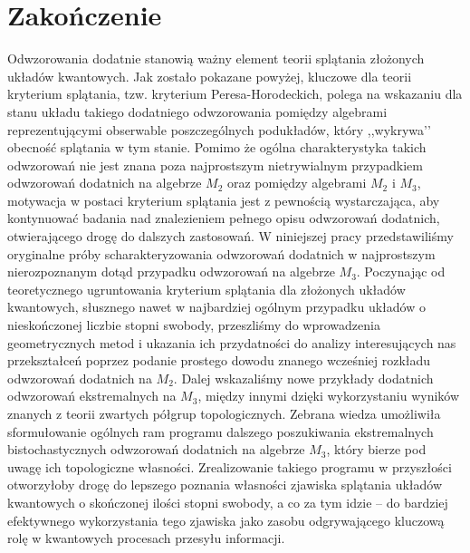 \chapter*{Zakończenie}
    \label{chap:Zakończenie}

Odwzorowania dodatnie stanowią ważny element teorii splątania złożonych
układów kwantowych.
Jak zostało pokazane powyżej,
kluczowe dla teorii kryterium splątania,
tzw. kryterium Peresa-Horodeckich,
polega na wskazaniu dla stanu układu takiego
dodatniego odwzorowania pomiędzy algebrami reprezentującymi obserwable
poszczególnych podukładów, który ,,wykrywa’’ obecność splątania w tym stanie.
Pomimo że ogólna charakterystyka takich odwzorowań nie jest znana poza
najprostszym nietrywialnym przypadkiem odwzorowań dodatnich na algebrze
$M_{2}$ oraz pomiędzy algebrami $M_{2}$ i $M_{3}$, motywacja w postaci kryterium
splątania jest z pewnością wystarczająca,
aby kontynuować badania nad znalezieniem pełnego opisu odwzorowań dodatnich,
otwierającego drogę do dalszych zastosowań.
W niniejszej pracy przedstawiliśmy oryginalne próby scharakteryzowania
odwzorowań dodatnich w najprostszym nierozpoznanym dotąd przypadku odwzorowań
na algebrze $M_{3}$.
Poczynając od teoretycznego ugruntowania kryterium splątania dla złożonych
układów kwantowych,
słusznego nawet w najbardziej ogólnym przypadku układów
o nieskończonej liczbie stopni swobody,
przeszliśmy do wprowadzenia geometrycznych metod i ukazania ich przydatności do
analizy interesujących nas przekształceń
poprzez podanie prostego dowodu znanego wcześniej rozkładu
odwzorowań dodatnich na $M_{2}$.
Dalej wskazaliśmy nowe przykłady dodatnich odwzorowań ekstremalnych na $M_{3}$,
między innymi dzięki wykorzystaniu wyników znanych
z teorii zwartych półgrup topologicznych.
Zebrana wiedza umożliwiła sformułowanie ogólnych ram programu dalszego
poszukiwania ekstremalnych bistochastycznych odwzorowań dodatnich
na algebrze $M_{3}$,
który bierze pod uwagę ich topologiczne własności.
Zrealizowanie takiego programu w przyszłości otworzyłoby drogę do lepszego
poznania własności zjawiska splątania układów kwantowych o skończonej ilości
stopni swobody,
a co za tym idzie -- do bardziej efektywnego wykorzystania tego zjawiska jako
zasobu odgrywającego kluczową rolę w kwantowych procesach przesyłu informacji.
